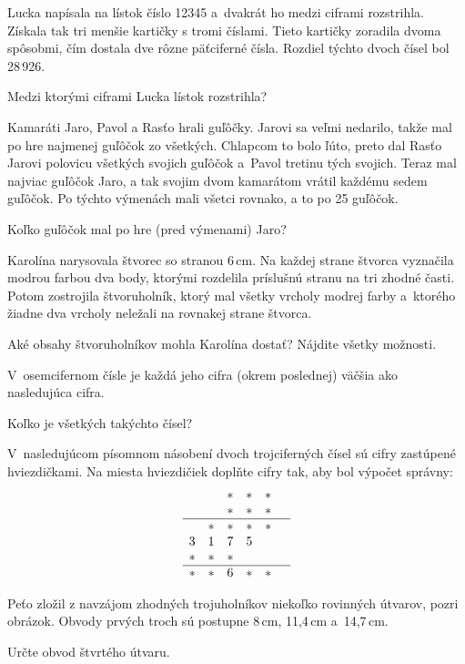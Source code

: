 {%
Lucka napísala na lístok číslo 12345 a~dvakrát ho medzi ciframi rozstrihla.
Získala tak tri menšie kartičky s tromi číslami.
Tieto kartičky zoradila dvoma spôsobmi, čím dostala dve rôzne päťciferné čísla.
Rozdiel týchto dvoch čísel bol 28\,926.

Medzi ktorými ciframi Lucka lístok rozstrihla?
}

{%
Kamaráti Jaro, Pavol a Rasťo hrali guľôčky.
Jarovi sa veľmi nedarilo, takže mal po hre najmenej guľôčok zo všetkých.
Chlapcom to bolo ľúto, preto dal Rasťo Jarovi polovicu všetkých svojich guľôčok a~Pavol tretinu tých svojich.
Teraz mal najviac guľôčok Jaro, a tak svojim dvom kamarátom vrátil každému sedem guľôčok.
Po týchto výmenách mali všetci rovnako, a to po 25 guľôčok.

Koľko guľôčok mal po hre (pred výmenami) Jaro?
}

{%
Karolína narysovala štvorec so stranou 6\,cm.
Na každej strane štvorca vyznačila modrou farbou dva body, ktorými rozdelila príslušnú stranu na tri zhodné časti.
Potom zostrojila štvoruholník, ktorý mal všetky vrcholy modrej farby a~ktorého žiadne dva vrcholy neležali na rovnakej strane štvorca.

Aké obsahy štvoruholníkov mohla Karolína dostať?
Nájdite všetky možnosti.
}

{%
V~osemcifernom čísle je každá jeho cifra (okrem poslednej) väčšia ako nasledujúca cifra.

Koľko je všetkých takýchto čísel?
}

{%
V~nasledujúcom písomnom násobení dvoch trojciferných čísel sú cifry zastúpené hviezdičkami.
Na miesta hviezdičiek doplňte cifry tak, aby bol výpočet správny:
$$
\begin{array}{cccccc}
 & & * & * & * & \\
 & & * & * & * & \\
\hline
 & * & * & * & * & \\
3 & 1 & 7 & 5 & & \\
* & * & * & & & \\
\hline
* & * & 6 & * & * & \\
\end{array}
$$
}

{%
Peťo zložil z navzájom zhodných trojuholníkov niekoľko rovinných útvarov, pozri obrázok.
Obvody prvých troch sú postupne 8\,cm, 11,4\,cm a~14,7\,cm.

Určte obvod štvrtého útvaru.
%
}

